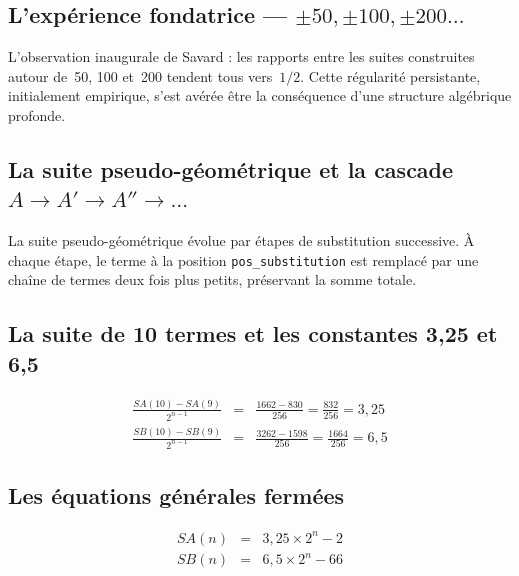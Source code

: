 \documentclass[]{pasj02}
\begin{document}
\subsection{L'expérience fondatrice --- $\pm 50, \pm 100, \pm 200\ldots$}
\label{ssec:experience}

L'observation inaugurale de Savard : les rapports entre les suites
construites autour de~50, 100 et~200 tendent tous vers~$1/2$.  Cette
régularité persistante, initialement empirique, s'est avérée être la
conséquence d'une structure algébrique profonde.

\subsection{La suite pseudo-géométrique et la cascade $A \to A' \to A''
\to \ldots$}
\label{ssec:cascade}

La suite pseudo-géométrique évolue par étapes de substitution successive.
À chaque étape, le terme à la position \texttt{pos\_substitution} est
remplacé par une chaîne de termes deux fois plus petits, préservant la somme
totale.

\subsection{La suite de 10 termes et les constantes 3,25 et 6,5}
\label{ssec:constantes}
\label{hol:constantes_savard}

\begin{eqnarray}
  \frac{SA(10)-SA(9)}{2^{n-1}} &=& \frac{1662-830}{256}
    = \frac{832}{256} = 3{,}25 \\
  \frac{SB(10)-SB(9)}{2^{n-1}} &=& \frac{3262-1598}{256}
    = \frac{1664}{256} = 6{,}5
\end{eqnarray}

\subsection{Les équations générales fermées}
\label{ssec:equations}
\label{hol:equations_fermees}
\begin{eqnarray}
  SA(n) &=& 3{,}25 \times 2^n - 2 \label{eq:SA}\\
  SB(n) &=& 6{,}5 \times 2^n - 66 \label{eq:SB}
\end{eqnarray}

\end{document}
